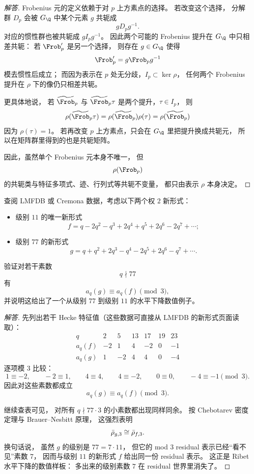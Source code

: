 \begin{proof}[解答]
Frobenius 元的定义依赖于对 $p$ 上方素点的选择。
若改变这个选择，
分解群 $D_p$ 会被 $G_\Q$ 中某个元素 $g$ 共轭成
\[
  gD_pg^{-1}.
\]
对应的惯性群也被共轭成 $gI_pg^{-1}$。
因此两个可能的 Frobenius 提升在 $G_\Q$ 中只相差共轭：
若 $\Frob_p'$ 是另一个选择，
则存在 $g\in G_\Q$ 使得
\[
  \Frob_p'=g\Frob_pg^{-1}
\]
模去惯性后成立；
而因为表示在 $p$ 处无分歧，$I_p\subset \ker\rho$，
任何两个 Frobenius 提升在 $\rho$ 下的像仍只相差共轭。

更具体地说，
若 $\widetilde\Frob_p$ 与 $\widetilde\Frob_p\tau$ 是两个提升，$\tau\in I_p$，
则
\[
  \rho(\widetilde\Frob_p\tau)=\rho(\widetilde\Frob_p)\rho(\tau)=\rho(\widetilde\Frob_p)
\]
因为 $\rho(\tau)=1$。
若再改变 $p$ 上方素点，只会在 $G_\Q$ 里把提升换成共轭元，
所以在矩阵群里得到的也是共轭矩阵。

因此，虽然单个 Frobenius 元本身不唯一，
但
\[
  \rho(\Frob_p)
\]
的共轭类与特征多项式、迹、行列式等共轭不变量，
都只由表示 $\rho$ 本身决定。
\end{proof}

\begin{exercise}
查阅 LMFDB 或 Cremona 数据，考虑以下两个权 $2$ 新形式：
\begin{itemize}
  \item 级别 $11$ 的唯一新形式
  \[
    f=q-2q^2-q^3+2q^4+q^5+2q^6-2q^7+\cdots;
  \]
  \item 级别 $77$ 的新形式
  \[
    g=q+q^2+2q^3-q^4-2q^5+2q^6-q^7+\cdots.
  \]
\end{itemize}
验证对若干素数
\[
  q\nmid 77
\]
有
\[
  a_q(g)\equiv a_q(f)\pmod 3,
\]
并说明这给出了一个从级别 $77$ 到级别 $11$ 的水平下降数值例子。
\end{exercise}

\begin{proof}[解答]
先列出若干 Hecke 特征值（这些数据可直接从 LMFDB 的新形式页面读取）：
\[
\begin{array}{c|cccccc}
q & 2 & 5 & 13 & 17 & 19 & 23 \\\hline
a_q(f) & -2 & 1 & 4 & -2 & 0 & -1 \\
 a_q(g) & 1 & -2 & 4 & 4 & 0 & -4
\end{array}
\]
逐项模 $3$ 比较：
\[
  1\equiv -2,
  \qquad -2\equiv 1,
  \qquad 4\equiv 4,
  \qquad 4\equiv -2,
  \qquad 0\equiv 0,
  \qquad -4\equiv -1
  \pmod 3.
\]
因此对这些素数都成立
\[
  a_q(g)\equiv a_q(f)\pmod 3.
\]

继续查表可见，
对所有 $q\nmid 77\cdot 3$ 的小素数都出现同样同余。
按 Chebotarev 密度定理与 Brauer--Nesbitt 原理，
这强烈表明
\[
  \bar{\rho}_{g,3}\cong \bar{\rho}_{f,3}.
\]
换句话说，
虽然 $g$ 的级别是 $77=7\cdot 11$，
但它的 mod $3$ residual 表示已经“看不见”素数 $7$，
因而与级别 $11$ 的新形式 $f$ 给出同一份 residual 表示。
这正是 Ribet 水平下降的数值样板：
多出来的级别素数 $7$ 在 residual 世界里消失了。
\end{proof}

